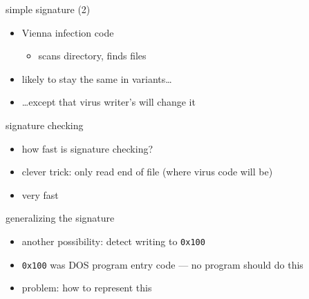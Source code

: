 \begin{frame}{simple signature (2)}
    \begin{itemize}
    \item Vienna infection code
        \begin{itemize}
        \item scans directory, finds files
        \end{itemize}
    \item likely to stay the same in variants\ldots
    \item \ldots except that virus writer's will change it
    \end{itemize}
\end{frame}

{ %
    \contourlength{.2mm}
    \begin{frame}[plain]
     \end{frame}
}
\begin{frame}{signature checking}
    \begin{itemize}
    \item how fast is signature checking?
    \item clever trick: only read end of file (where virus code will be)
    \item very fast
    \end{itemize}
\end{frame}

\begin{frame}{generalizing the signature}
    \begin{itemize}
    \item another possibility: detect writing to {\tt 0x100}
    \item {\tt 0x100} was DOS program entry code  --- no program should do this
    \item problem: how to represent this
    \end{itemize}
\end{frame}


